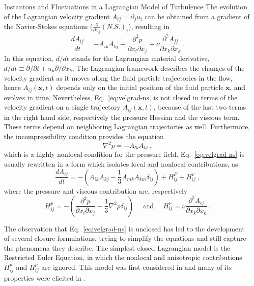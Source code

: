 \begin{chapter}{Instantons and Fluctuations in a Lagrangian Model of Turbulence}
The evolution of the Lagrangian velocity gradient $A_{ij} = \partial_j u_i$ can be obtained from a gradient of the Navier-Stokes equations ($\frac{\partial}{\partial x_j} (N.S.)_i$), resulting in
\begin{equation} \label{eq:velgrad-ns}
    \frac{d A_{i j}}{d t}=-A_{i k} A_{k j}-\frac{\partial^{2} p}{\partial x_{i} \partial x_{j}}+\nu \frac{\partial^{2} A_{j j}}{\partial x_{k} \partial x_{k}} \ .
\end{equation}
In this equation, $d/dt$ stands for the Lagrangian material derivative, $d / d t \equiv \partial / \partial t+u_{k} \partial / \partial x_{k}$. The Lagrangian framework describes the changes of the velocity gradient as it moves along the fluid particle trajectories in the flow, hence $A_{ij}(\mathbf{x},t)$ depends only on the initial position of the fluid particle $\mathbf{x}$, and evolves in time. Nevertheless, Eq.~\eqref{eq:velgrad-ns} is not closed in terms of the velocity gradient on a single trajectory $A_{ij}(\mathbf{x},t)$, because of the last two terms in the right hand side, respectively the pressure Hessian and the viscous term. These terms depend on neighboring Lagrangian trajectories as well. Furthermore, the incompressibility condition provides the equation
\begin{equation}
    \nabla^{2} p=-A_{l k} A_{k l} \ ,
\end{equation}
which is a highly nonlocal condition for the pressure field.
Eq.~\eqref{eq:velgrad-ns} is usually rewritten in a form which isolates local and nonlocal contributions, as
\begin{equation}
    \frac{d A_{i j}}{d t}=-\left(A_{i k} A_{k j}-\frac{1}{3} A_{m k} A_{k m} \delta_{i j}\right)+H_{i j}^{P}+H_{i j}^{\nu} \ ,
\end{equation}
where the pressure and viscous contribution are, respectively
\begin{equation}
    H_{i j}^{p}=-\left(\frac{\partial^{2} p}{\partial x_{i} \partial x_{j}}-\frac{1}{3} \nabla^{2} p \delta_{i j}\right) \quad \text { and } \quad H_{i j}^{\nu}=\nu \frac{\partial^{2} A_{i j}}{\partial x_{k} \partial x_{k}} \ .
\end{equation}

The observation that Eq.~\eqref{eq:velgrad-ns} is unclosed has led to the development of several closure formulations, trying to simplify the equations and still capture the phenomena they describe. The simplest closed Lagrangian model is the Restricted Euler Equation, in which the nonlocal and anisotropic contributions $H_{ij}^p$ and $H_{ij}^{\nu}$ are ignored. This model was first considered in \textcite{leorat1975turbulence} and many of its properties were elicited in \textcite{vieillefosse1982,vieillefosse1984}.


\end{chapter}
